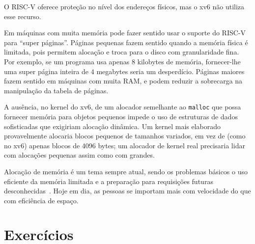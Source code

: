 O RISC-V oferece proteção no nível dos endereços físicos, mas o xv6 não utiliza esse recurso.

Em máquinas com muita memória pode fazer sentido usar o suporte do RISC-V para ``super páginas''. Páginas pequenas fazem sentido quando a memória física é limitada, pois permitem alocação e troca 
para o disco com granularidade fina. Por exemplo, se um programa usa apenas 8 kilobytes de memória, fornecer-lhe uma super página inteira de 4 megabytes seria um desperdício. Páginas maiores fazem 
sentido em máquinas com muita RAM, e podem reduzir a sobrecarga na manipulação da tabela de páginas.

A ausência, no kernel do xv6, de um alocador semelhante ao {\tt malloc} que possa fornecer memória para objetos pequenos impede o uso de estruturas de dados sofisticadas que exigiriam alocação 
dinâmica. Um kernel mais elaborado provavelmente alocaria blocos pequenos de tamanhos variados, em vez de (como no xv6) apenas blocos de 4096 bytes; um alocador de kernel real precisaria lidar com 
alocações pequenas assim como com grandes.

Alocação de memória é um tema sempre atual, sendo os problemas básicos o uso eficiente da memória limitada e a preparação para requisições futuras desconhecidas~\cite{knuth}. Hoje em dia, as 
pessoas se importam mais com velocidade do que com eficiência de espaço.

\section{Exercícios}

